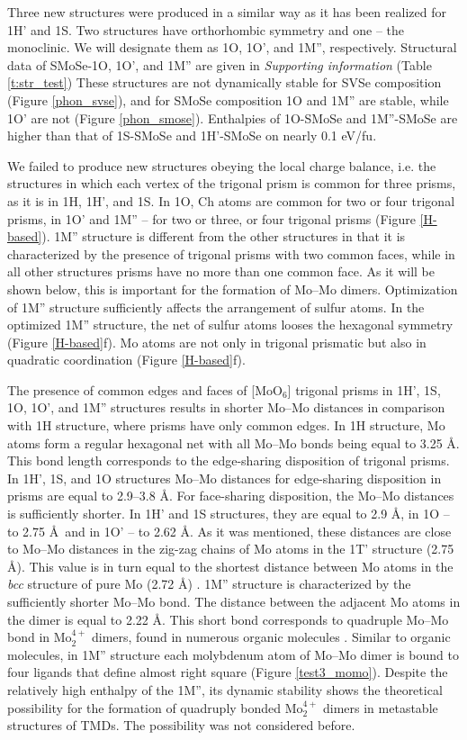 \documentclass[a4paperm]{article}
\begin{document}
Three new structures were produced in a similar way as it has been realized for 1H' and 1S.
Two structures have orthorhombic symmetry and one – the monoclinic.
We will designate them as 1O, 1O', and 1M'', respectively.
Structural data of SMoSe-1O, 1O', and 1M'' are given in {\it Supporting information} (Table \ref{t:str_test})
These structures are not dynamically stable for SVSe composition (Figure \ref{phon_svse}), and for SMoSe composition 1O and 1M'' are stable, while 1O' are not (Figure \ref{phon_smose}).
Enthalpies of 1O-SMoSe and 1M''-SMoSe are higher than that of  1S-SMoSe and 1H'-SMoSe on nearly 0.1 eV/fu.

We failed to produce new structures obeying the local charge balance, i.e. the structures in which each vertex of the trigonal prism is common for three prisms, as it is in 1H, 1H', and 1S.
In 1O, Ch atoms are common for two or four trigonal prisms, in 1O' and 1M'' – for two or three, or four trigonal prisms (Figure \ref{H-based}).
1M'' structure is different from the other structures in that it is characterized by the presence of trigonal prisms with two common faces, while in all other structures prisms have no more than one common face.
As it will be shown below, this is important for the formation of Mo--Mo dimers.
Optimization of 1M'' structure sufficiently affects the arrangement of sulfur atoms.
In the optimized 1M'' structure, the net of sulfur atoms looses the hexagonal symmetry (Figure \ref{H-based}f).
Mo atoms are not only in trigonal prismatic but also in quadratic coordination (Figure \ref{H-based}f).


The presence of common edges and faces of [MoO$_6$] trigonal prisms in 1H', 1S, 1O, 1O', and 1M'' structures results in shorter Mo--Mo distances in comparison with 1H structure, where prisms have only common edges.
In 1H structure, Mo atoms form a regular hexagonal net with all Mo--Mo bonds being equal to 3.25 \AA.
This bond length corresponds to the edge-sharing disposition of trigonal prisms.
In 1H', 1S, and 1O structures Mo--Mo distances for edge-sharing disposition in prisms are equal to 2.9--3.8 \AA.
For face-sharing disposition, the Mo--Mo distances is sufficiently shorter.
In 1H' and 1S structures, they are equal to 2.9 \AA, in 1O -- to 2.75 \AA\ and in 1O' -- to 2.62 \AA.
As it was mentioned, these distances are close to Mo--Mo distances in the zig-zag chains of Mo atoms in the 1T' structure (2.75 \AA).
This value is in turn equal to the shortest distance between Mo atoms in the {\it bcc} structure of pure Mo (2.72 \AA) \cite{MoV}.
1M'' structure is characterized by the sufficiently shorter Mo--Mo bond.
The distance between the adjacent Mo atoms in the dimer is equal to 2.22 \AA.
This short bond corresponds to quadruple Mo--Mo bond in Mo$_2^{4+}$ dimers, found in numerous organic molecules \cite{momo}.
Similar to organic molecules, in 1M'' structure  each molybdenum atom of Mo--Mo dimer is bound to four ligands that define almost right square (Figure \ref{test3_momo}).
Despite the relatively high enthalpy of the 1M'', its dynamic stability shows the theoretical possibility for the formation of quadruply bonded Mo$_2^{4+}$ dimers in metastable structures of TMDs.
The possibility was not considered before.
\end{document}
